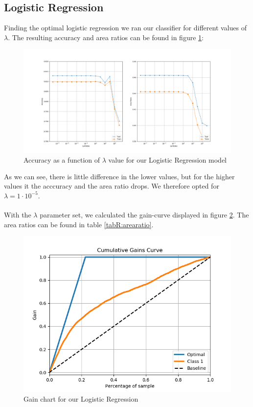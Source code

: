 \documentclass[12pt]{article}
\numberwithin{figure}{section}
\begin{document}
\subsection{Logistic Regression}
Finding the optimal logistic regression we ran our classifier for different values of $\lambda$. The resulting accuracy and area ratios can be found in figure \ref{figR:LogRegParam}:
\begin{figure}[H]
\centering
\includegraphics[scale=0.38]{../figures/LogRegOpti.png}
\caption{Accuracy as a function of $\lambda$ value for our Logistic Regression model}
\label{figR:LogRegParam}
\end{figure}
As we can see, there is little difference in the lower values, but for the higher values it the acccuracy and the area ratio drops. We therefore opted for $\lambda = 1\cdot 10^{-5}$.\\ \\
With the $\lambda$ parameter set, we calculated the gain-curve displayed in figure \ref{figR:LogReggain}. The area ratios can be found in table \ref{tabR:arearatio}.
\begin{figure}[H]
\centering
\includegraphics[scale=0.8]{../figures/gain-LogReg.png}
\caption{Gain chart for our Logistic Regression}
\label{figR:LogReggain}
\end{figure}
\end{document}
